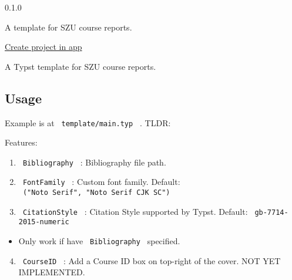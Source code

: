 { 0.1.0 }

A template for SZU course reports.

\href{/app?template=casual-szu-report&version=0.1.0}{Create project in
app}

\label{readme}
A Typst template for SZU course reports.

\subsection{Usage}\label{usage}

Example is at \texttt{\ template/main.typ\ } . TLDR:

\begin{Shaded}
\begin{Highlighting}[]

\NormalTok{  ),}
\NormalTok{)}
\end{Highlighting}
\end{Shaded}

Features:

\begin{enumerate}
\tightlist
\item
  \texttt{\ Bibliography\ } : Bibliography file path.
\item
  \texttt{\ FontFamily\ } : Custom font family. Default:
  \texttt{\ ("Noto\ Serif",\ "Noto\ Serif\ CJK\ SC")\ }
\item
  \texttt{\ CitationStyle\ } : Citation Style supported by Typst.
  Default: \texttt{\ gb-7714-2015-numeric\ }
\end{enumerate}

\begin{itemize}
\tightlist
\item
  Only work if have \texttt{\ Bibliography\ } specified.
\end{itemize}

\begin{enumerate}
\setcounter{enumi}{3}
\tightlist
\item
  \texttt{\ CourseID\ } : Add a Course ID box on top-right of the cover.
  NOT YET IMPLEMENTED.
\end{enumerate}

